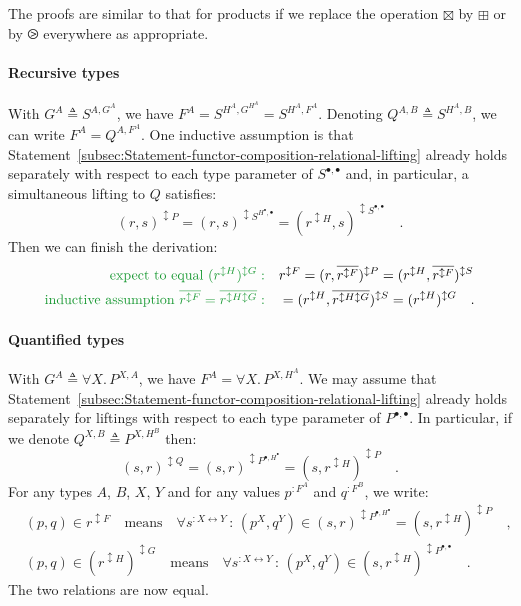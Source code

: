 The proofs are similar to that for products if we replace the operation
$\boxtimes$ by $\boxplus$ or by $\ogreaterthan$ everywhere as appropriate.

\paragraph{Recursive types}

With $G^{A}\triangleq S^{A,G^{A}}$, we have $F^{A}=S^{H^{A},G^{H^{A}}}=S^{H^{A},F^{A}}$.
Denoting $Q^{A,B}\triangleq S^{H^{A},B}$, we can write $F^{A}=Q^{A,F^{A}}$.
One inductive assumption is that Statement~\ref{subsec:Statement-functor-composition-relational-lifting}
already holds separately with respect to each type parameter of $S^{\bullet,\bullet}$
and, in particular, a simultaneous lifting to $Q$ satisfies:
\[
(r,s)^{\updownarrow P}=(r,s)^{\updownarrow S^{H^{\bullet},\bullet}}=(r^{\updownarrow H},s)^{\updownarrow S^{\bullet,\bullet}}\quad.
\]
Then we can finish the derivation:
\begin{align*}
{\color{greenunder}\text{expect to equal }(r^{\updownarrow H})^{\updownarrow G}:}\quad & r^{\updownarrow F}=(r,\overline{r^{\updownarrow F}})^{\updownarrow P}=(r^{\updownarrow H},\overline{r^{\updownarrow F}})^{\updownarrow S}\\
{\color{greenunder}\text{inductive assumption }\overline{r^{\updownarrow F}}=\overline{r^{\updownarrow H\updownarrow G}}:}\quad & =(r^{\updownarrow H},\overline{r^{\updownarrow H\updownarrow G}})^{\updownarrow S}=(r^{\updownarrow H})^{\updownarrow G}\quad.
\end{align*}


\paragraph{Quantified types}

With $G^{A}\triangleq\forall X.\,P^{X,A}$, we have $F^{A}=\forall X.\,P^{X,H^{A}}$.
We may assume that Statement~\ref{subsec:Statement-functor-composition-relational-lifting}
already holds separately for liftings with respect to each type parameter
of $P^{\bullet,\bullet}$. In particular, if we denote $Q^{X,B}\triangleq P^{X,H^{B}}$
then:
\[
(s,r)^{\updownarrow Q}=(s,r)^{\updownarrow P^{\bullet,H^{\bullet}}}=(s,r^{\updownarrow H})^{\updownarrow P}\quad.
\]
For any types $A$, $B$, $X$, $Y$ and for any values $p^{:F^{A}}$
and $q^{:F^{B}}$, we write:
\begin{align*}
 & (p,q)\in r^{\updownarrow F}\quad\text{means}\quad\forall s^{:X\leftrightarrow Y}\,:\,(p^{X},q^{Y})\in(s,r)^{\updownarrow P^{\bullet,H^{\bullet}}}=(s,r^{\updownarrow H})^{\updownarrow P}\quad,\\
 & (p,q)\in(r^{\updownarrow H})^{\updownarrow G}\quad\text{means}\quad\forall s^{:X\leftrightarrow Y}\,:\,(p^{X},q^{Y})\in(s,r^{\updownarrow H})^{\updownarrow P^{\bullet,\bullet}}\quad.
\end{align*}
The two relations are now equal. 

